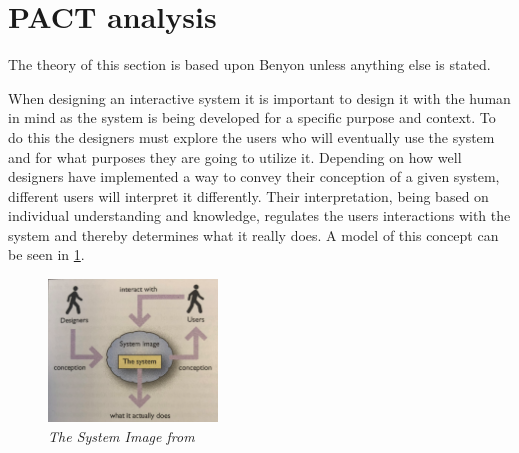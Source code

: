 
\section{PACT analysis}\label{sec:PACT}
The theory of this section is based upon Benyon \cite{Benyon} unless anything else is stated.

When designing an interactive system it is important to design it with the human in mind as the system is being developed for a specific purpose and context.
To do this the designers must explore the users who will eventually use the system and for what purposes they are going to utilize it.
Depending on how well designers have implemented a way to convey their conception of a given system, different users will interpret it differently.
Their interpretation, being based on individual understanding and knowledge, regulates the users interactions with the system and thereby determines what it really does.
A model of this concept can be seen in \cref{fig:PACT-SystemImage}.

\begin{figure}[H]
	\centering
	\includegraphics[width=0.4\textwidth]{billeder/SystemImage-Benyon.png}
	\caption{\textit{The System Image from \citep[p.~31]{Benyon}}}
	\label{fig:PACT-SystemImage}
\end{figure}

